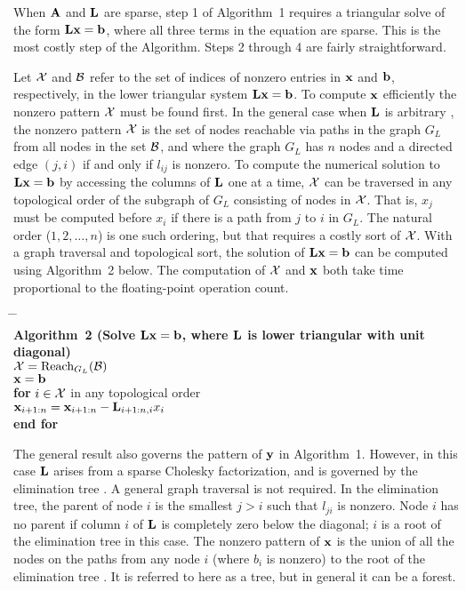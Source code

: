 \documentclass[12pt]{article}
\newcommand{\m}[1]{{\bf{#1}}}       %
\begin{document}
When $\m{A}$ and $\m{L}$ are sparse, step 1 of Algorithm~1 requires a
triangular solve of the form $\m{Lx}=\m{b}$, where all three terms in
the equation are sparse.  This is the most costly step of the Algorithm.
Steps 2 through 4 are fairly straightforward.

Let ${\cal X}$ and ${\cal B}$ refer to the set of indices of nonzero entries
in $\m{x}$ and $\m{b}$, respectively, in the lower triangular system
$\m{Lx}=\m{b}$.  To compute $\m{x}$ efficiently
the nonzero pattern ${\cal X}$ must be found first.
In the general case when $\m{L}$ is arbitrary \cite{GilbertPeierls88},
the nonzero
pattern ${\cal X}$ is the set of nodes reachable via paths in the graph $G_L$
from all nodes in the set ${\cal B}$, and where the graph $G_L$ has
$n$ nodes and a directed edge $(j,i)$ if and only if $l_{ij}$ is nonzero.
To compute the numerical solution to $\m{Lx}=\m{b}$ by accessing the columns of
$\m{L}$ one at a time, ${\cal X}$ can be traversed
in any topological order of the subgraph of $G_L$ consisting of nodes in
${\cal X}$.  That is, $x_j$ must be computed before $x_i$ if there is a path
from $j$ to $i$ in $G_L$.  The natural order ($1, 2, \ldots, n$) is one such
ordering, but that requires a costly sort of ${\cal X}$.
With a graph traversal and topological sort, the solution of $\m{Lx}=\m{b}$
can be computed using Algorithm~2 below.
The computation of ${\cal X}$ and $\m{x}$ both take
time proportional to the floating-point operation count.
\vspace{-0.2in}
\begin{tabbing}
\hspace{2em} \= \hspace{2em} \= \hspace{2em} \= \\
{\bf Algorithm~2
(Solve $\m{Lx}=\m{b}$, where $\m{L}$ is lower triangular with unit diagonal)} \\
\> ${\cal X} = \mbox{Reach}_{G_L} ({\cal B})$ \\
\> $\m{x} = \m{b}$ \\
\> {\bf for} $i \in {\cal X}$ in any topological order \\
\>\> $\m{x}_{i+1:n} = \m{x}_{i+1:n} - \m{L}_{i+1:n,i} x_i$ \\
\> {\bf end for}
\end{tabbing}

The general result also governs the pattern of $\m{y}$ in Algorithm~1.
However, in this case $\m{L}$ arises from a sparse Cholesky factorization,
and is governed by the elimination tree \cite{Liu90a}.
A general graph traversal is not required.
In the elimination tree, the parent of node $i$ is the smallest $j > i$
such that $l_{ji}$ is nonzero.  Node $i$ has no parent if column $i$ of
$\m{L}$ is completely zero below the diagonal; $i$ is a root of the
elimination tree in this case.  The nonzero pattern of $\m{x}$ is the
union of all the nodes on the paths from any node $i$ (where $b_i$ is nonzero) to the
root of the elimination tree \cite[Thm 2.4]{Liu86c}.  It is referred to here as a tree,
but in general it can be a forest.
\end{document}
